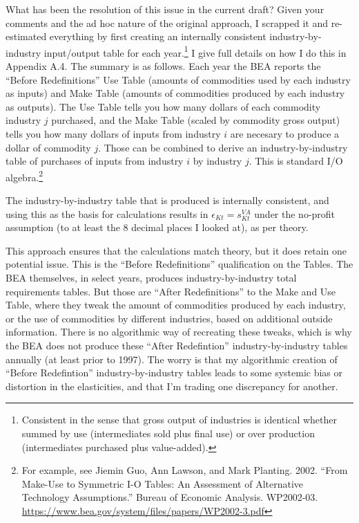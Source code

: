 \documentclass[11pt]{article}
\begin{document}
What has been the resolution of this issue in the current draft? Given your comments and the ad hoc nature of the original approach, I scrapped it and re-estimated everything by first creating an internally consistent industry-by-industry input/output table for each year.\footnote{Consistent in the sense that gross output of industries is identical whether summed by use (intermediates sold plus final use) or over production (intermediates purchased plus value-added).} I give full details on how I do this in Appendix A.4. The summary is as follows. Each year the BEA reports the ``Before Redefinitions'' Use Table (amounts of commodities used by each industry as inputs) and Make Table (amounts of commodities produced by each industry as outputs). The Use Table tells you how many dollars of each commodity industry $j$ purchased, and the Make Table (scaled by commodity gross output) tells you how many dollars of inputs from industry $i$ are necesary to produce a dollar of commodity $j$. Those can be combined to derive an industry-by-industry table of purchases of inputs from industry $i$ by industry $j$. This is standard I/O algebra.\footnote{For example, see Jiemin Guo, Ann Lawson, and Mark Planting. 2002. ``From Make-Use to Symmetric I-O Tables: An Assessment of Alternative Technology Assumptions.'' Bureau of Economic Analysis. WP2002-03. \url{https://www.bea.gov/system/files/papers/WP2002-3.pdf}}

The industry-by-industry table that is produced is internally consistent, and using this as the basis for calculations results in $\epsilon_{Kt} = s_{Kt}^{VA}$ under the no-profit assumption (to at least the 8 decimal places I looked at), as per theory. 

This approach ensures that the calculations match theory, but it does retain one potential issue. This is the ``Before Redefinitions'' qualification on the Tables. The BEA themselves, in select years, produces industry-by-industry total requirements tables. But those are ``After Redefinitions'' to the Make and Use Table, where they tweak the amount of commodities produced by each industry, or the use of commodities by different industries, based on additional outside information. There is no algorithmic way of recreating these tweaks, which is why the BEA does not produce these ``After Redefintion'' industry-by-industry tables annually (at least prior to 1997). The worry is that my algorithmic creation of ``Before Redefintion'' industry-by-industry tables leads to some systemic bias or distortion in the elasticities, and that I'm trading one discrepancy for another.
\end{document}

